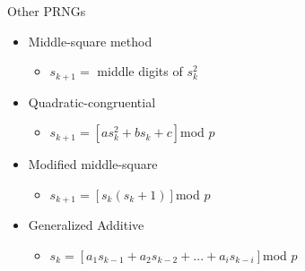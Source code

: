 \documentclass[xcolor=x11names,compress]{beamer}
\renewcommand{\(}{\begin{columns}}
\renewcommand{\)}{\end{columns}}
\newcommand{\<}[1]{\begin{column}{#1}}
\renewcommand{\>}{\end{column}}
\begin{document}
\begin{frame}{Other PRNGs}
\begin{itemize}
\item Middle-square method
\begin{itemize}
\item $s_{k+1}=$ middle digits of $s_k^2$
\end{itemize}
\item Quadratic-congruential
\begin{itemize}
\item $s_{k+1}=[as_k^2+bs_k+c]$mod $p$
\end{itemize}
\item Modified middle-square
\begin{itemize}
\item $s_{k+1}=[s_k(s_k+1)]$mod $p$
\end{itemize}
\item Generalized Additive
\begin{itemize}
\item $s_{k}=[a_1s_{k-1}+a_2s_{k-2}+...+a_is_{k-i}]$mod $p$
\end{itemize}
\end{itemize}  	
\end{frame}
\end{document}
